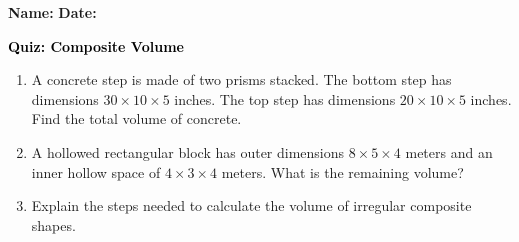 \documentclass[12pt, letterpaper, fleqn]{article}
\begin{document}
\textbf{Name:} \underline{\hspace{5cm}}
\hfill
\textbf{Date:} \underline{\hspace{3cm}}\\

\begin{tcolorbox}[colback=customteal!20]
    \large\textcolor{black}{\textbf{Quiz: Composite Volume}}
\end{tcolorbox}
\begin{enumerate}[itemsep=3.5cm, leftmargin=0.6cm]
\item A concrete step is made of two prisms stacked. The bottom step has dimensions $30 \times 10 \times 5$ inches. The top step has dimensions $20 \times 10 \times 5$ inches. Find the total volume of concrete.
\vspace{3.5cm}
\item A hollowed rectangular block has outer dimensions $8 \times 5 \times 4$ meters and an inner hollow space of $4 \times 3 \times 4$ meters. What is the remaining volume?
\vspace{3.5cm}
\item Explain the steps needed to calculate the volume of irregular composite shapes.
\end{enumerate}
\end{document}
